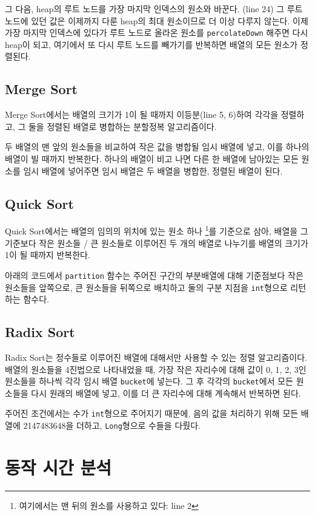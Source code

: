 \documentclass{article}
\begin{document}
	그 다음, heap의 루트 노드를 가장 마지막 인덱스의 원소와 바꾼다. (line 24)
	그 루트 노드에 있던 값은 이제까지 다룬 heap의 최대 원소이므로 더 이상
	다루지 않는다.
	이제 가장 마지막 인덱스에 있다가 루트 노드로 올라온 원소를 \texttt{percolateDown}
	해주면 다시 heap이 되고, 여기에서 또 다시 루트 노드를 빼가기를 반복하면
	배열의 모든 원소가 정렬된다.

	\clearpage
	
	\subsection{Merge Sort}
	Merge Sort에서는 배열의 크기가 1이 될 때까지 이등분(line 5, 6)하여 각각을 정렬하고,
	그 둘을 정렬된 배열로 병합하는 분할정복 알고리즘이다.
	
	두 배열의 맨 앞의 원소들을 비교하여 작은 값을 병합될 임시 배열에 넣고,
	이를 하나의 배열이 빌 때까지 반복한다.
	하나의 배열이 비고 나면 다른 한 배열에 남아있는 모든 원소를 임시 배열에 넣어주면
	임시 배열은 두 배열을 병합한, 정렬된 배열이 된다.
	
	\clearpage
	
	\subsection{Quick Sort}
	Quick Sort에서는 배열의 임의의 위치에 있는 원소 하나%
	\footnote{여기에서는 맨 뒤의 원소를 사용하고 있다: line 2}를 기준으로 삼아,
	배열을 그 기준보다 작은 원소들 / 큰 원소들로 이루어진 두 개의 배열로 나누기를
	배열의 크기가 1이 될 때까지 반복한다.
	
	아래의 코드에서 \texttt{partition} 함수는 주어진 구간의 부분배열에 대해
	기준점보다 작은 원소들을 앞쪽으로, 큰 원소들을 뒤쪽으로 배치하고
	둘의 구분 지점을 \texttt{int}형으로 리턴하는 함수다.
	
	
	\clearpage
	
	\subsection{Radix Sort}
	Radix Sort는 정수들로 이루어진 배열에 대해서만 사용할 수 있는 정렬 알고리즘이다.
	배열의 원소들을 4진법으로 나타내었을 때, 가장 작은 자리수에 대해 값이 0, 1, 2, 3인
	원소들을 하나씩 각각 임시 배열 \texttt{bucket}에 넣는다. 그 후 각각의 \texttt{bucket}에서
	모든 원소들을 다시 원래의 배열에 넣고, 이를 더 큰 자리수에 대해 계속해서 반복하면 된다.
	
	주어진 조건에서는 수가 \texttt{int}형으로 주어지기 때문에, 음의 값을 처리하기 위해
	모든 배열에 2147483648을 더하고, \texttt{Long}형으로 수들을 다뤘다.
	

	\clearpage
	
	\section{동작 시간 분석}
	
	
\end{document}
